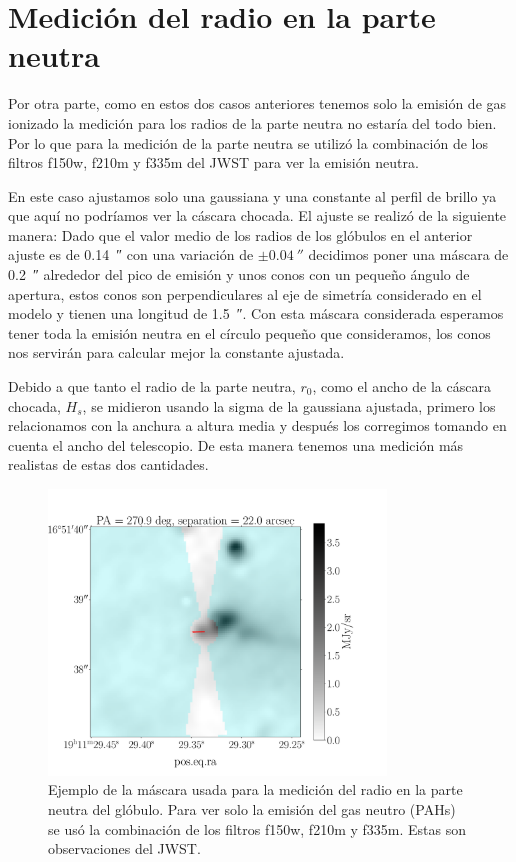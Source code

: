 \documentclass{book}
\begin{document}
\section{Medición del radio en la parte neutra}

Por otra parte, como en estos dos casos anteriores tenemos solo la emisión de gas ionizado la medición para los radios de la parte neutra no estaría del todo bien. Por lo que para la medición de la parte neutra se utilizó la combinación de los filtros f150w, f210m y f335m del JWST para ver la emisión neutra. 

En este caso ajustamos solo una gaussiana y una constante al perfil de brillo ya que aquí no podríamos ver la cáscara chocada. El ajuste se realizó de la siguiente manera: Dado que el valor medio de los radios de los glóbulos en el anterior ajuste es de  \SI{0.14}{\arcsecond} con una variación de $\pm\SI{0.04}{\arcsecond}$ decidimos poner una máscara de \SI{0.2}{\arcsecond} alrededor del pico de emisión y unos conos con un pequeño ángulo de apertura, estos conos son perpendiculares al eje de simetría considerado en el modelo y tienen una longitud de \SI{1.5}{\arcsecond}. Con esta máscara considerada esperamos tener toda la emisión neutra en el círculo pequeño que consideramos, los conos nos servirán para calcular mejor la constante ajustada. 

Debido a que tanto el radio de la parte neutra, $r_0$, como el ancho de la cáscara chocada, $H_s$, se midieron usando la sigma de la gaussiana ajustada, primero los relacionamos con la anchura a altura media y después los corregimos tomando en cuenta el ancho del telescopio. De esta manera tenemos una medición más realistas de estas dos cantidades.

\begin{figure}[htb]
    \centering
    \includegraphics[width=0.8\textwidth]{Nuevas imagenes finales/r_0_.pdf}
    \caption{Ejemplo de la máscara usada para la medición del radio en la parte neutra del glóbulo. Para ver solo la emisión del gas neutro (PAHs) se usó la combinación de los filtros f150w, f210m y f335m. Estas son observaciones del JWST.}
    \label{Medicion de r_0}
\end{figure}
\end{document}
